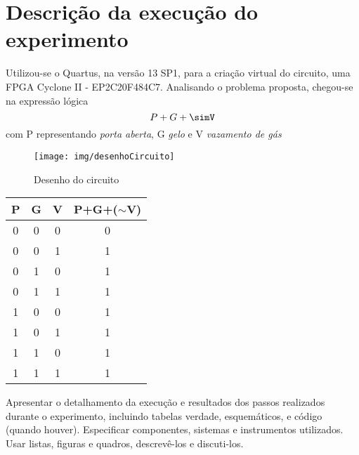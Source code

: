 
\chapter{Descrição da execução do experimento}
Utilizou-se o Quartus, na versão 13 SP1, para a criação virtual do circuito, uma FPGA Cyclone II - EP2C20F484C7.
Analisando o problema proposta, chegou-se na expressão lógica
$$ P + G + \simV$$
com P representando \textit{porta aberta}, G \textit{gelo} e V \textit{vazamento de gás}

\begin{figure}[htb]
    \centering
	\texttt{[image: img/desenhoCircuito]}
	\caption{\label{fig_logo}Desenho do circuito}
\end{figure}

\begin{tabular}{c|c|c|c}
\textbf{P} & \textbf{G} & \textbf{V} & \textbf{P+G+($\sim$V)} \\
\hline
0 & 0 & 0 & 0\\\hline
0 & 0 & 1 & 1\\\hline
0 & 1 & 0 & 1\\\hline
0 & 1 & 1 & 1\\\hline
1 & 0 & 0 & 1\\\hline
1 & 0 & 1 & 1\\\hline
1 & 1 & 0 & 1\\\hline
1 & 1 & 1 & 1
\end{tabular}



Apresentar   o   detalhamento   da  execução  e   resultados   dos   passos   realizados 
durante   o   experimento,   incluindo   tabelas   verdade,   esquemáticos,   e   código 
(quando  houver). 
Especificar  componentes,  sistemas  e  instrumentos  utilizados. 
Usar listas, figuras e quadros, descrevê-los e discuti-los.



